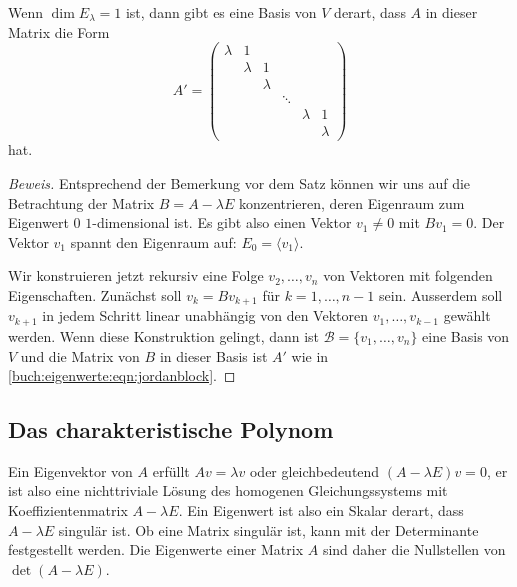 \begin{satz}
\label{buch:eigenwerte:satz:jordanblock}
Wenn $\dim E_\lambda=1$ ist, dann gibt es eine Basis von $V$ derart, dass
$A$ in dieser Matrix die Form
\begin{equation}
A'
=
\begin{pmatrix}
 \lambda &    1    &         &        &         &         \\
         & \lambda &    1    &        &         &         \\
         &         & \lambda &        &         &         \\
         &         &         & \ddots &         &         \\
         &         &         &        & \lambda &    1    \\
         &         &         &        &         & \lambda
\end{pmatrix}
\label{buch:eigenwerte:eqn:jordanblock}
\end{equation}
hat.
\end{satz}

\begin{proof}[Beweis]
Entsprechend der Bemerkung vor dem Satz können wir uns auf die Betrachtung
der Matrix $B=A-\lambda E$ konzentrieren, deren Eigenraum zum Eigenwert $0$
$1$-dimensional ist.
Es gibt also einen Vektor $v_1\ne 0$ mit $Bv_1=0$.
Der Vektor $v_1$ spannt den Eigenraum auf: $E_0 = \langle v_1\rangle$.

Wir konstruieren jetzt rekursiv eine Folge $v_2,\dots,v_n$ von Vektoren
mit folgenden Eigenschaften.
Zunächst soll $v_k=Bv_{k+1}$ für $k=1,\dots,n-1$ sein.
Ausserdem soll $v_{k+1}$ in jedem Schritt linear unabhängig von den
Vektoren $v_1,\dots,v_{k-1}$ gewählt werden.
Wenn diese Konstruktion gelingt, dann ist $\mathcal{B}=\{v_1,\dots,v_n\}$
eine Basis von $V$ und die Matrix von $B$ in dieser Basis ist
$A'$ wie in \eqref{buch:eigenwerte:eqn:jordanblock}.
\end{proof}

\subsection{Das charakteristische Polynom
\label{buch:subsection:das-charakteristische-polynom}}
Ein Eigenvektor von $A$ erfüllt $Av=\lambda v$ oder gleichbedeutend
$(A-\lambda E)v=0$, er ist also eine nichttriviale Lösung des homogenen
Gleichungssystems mit Koeffizientenmatrix $A-\lambda E$. 
Ein Eigenwert ist also ein Skalar derart, dass $A-\lambda E$
singulär ist.
Ob eine Matrix singulär ist, kann mit der Determinante festgestellt
werden.
Die Eigenwerte einer Matrix $A$ sind daher die Nullstellen
von $\det(A-\lambda E)$.

